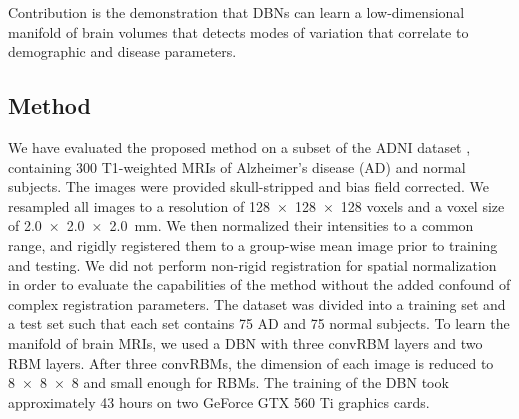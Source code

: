 Contribution is the demonstration that DBNs can learn a low-dimensional manifold
of brain volumes that detects modes of variation that correlate to demographic
and disease parameters.

\subsection{Method}




We have evaluated the proposed method on a subset of the ADNI dataset
\cite{Petersen2010}, containing 300 T1-weighted MRIs of Alzheimer's disease (AD)
and normal subjects. The images were provided skull-stripped and bias field
corrected. We resampled all images to a resolution of \num{128x128x128} voxels
and a voxel size of \SI{2.0x2.0x2.0}{\milli\meter}. We then normalized their
intensities to a common range, and rigidly registered them to a group-wise mean
image prior to training and testing. We did not perform non-rigid registration
for spatial normalization in order to evaluate the capabilities of the method
without the added confound of complex registration parameters. The dataset was
divided into a training set and a test set such that each set contains 75 AD and
75 normal subjects. To learn the manifold of brain MRIs, we used a DBN with
three convRBM layers and two RBM layers. After three convRBMs, the dimension of
each image is reduced to \num{8x8x8} and small enough for RBMs. The training of
the DBN took approximately 43 hours on two GeForce GTX 560 Ti graphics cards.

